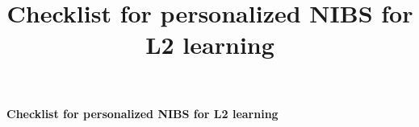 \documentclass[journal, onecolumn, 11pt]{IEEEtran}
\title{Checklist for personalized NIBS for L2 learning}
\begin{document}
	
	
	
	
	\begin{center}
		{ \Large  
			\textbf{Checklist for personalized NIBS for L2 learning}
		}
	\end{center}
\end{document}
